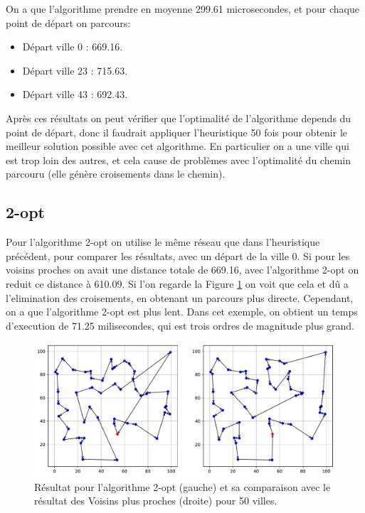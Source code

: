 \documentclass[a4paper,11pt,fleqn]{article}
\begin{document}
On a que l'algorithme prendre en moyenne 299.61 microsecondes, et pour chaque point de départ on parcours:
\begin{itemize}
    \item Départ ville 0 : 669.16.
    \item Départ ville 23 : 715.63.
    \item Départ ville 43 : 692.43.
\end{itemize}

Après ces résultats on peut vérifier que l'optimalité de l'algorithme depends du point de départ, donc il faudrait appliquer l'heuristique 50 fois pour obtenir le meilleur solution possible avec cet algorithme. En particulier on a une ville qui est trop loin des autres, et cela cause de problèmes avec l'optimalité du chemin parcouru (elle génère croisements dans le chemin).

\subsection*{2-opt}
Pour l'algorithme 2-opt on utilise le même réseau que dans l'heuristique précédent, pour comparer les résultats, avec un départ de la ville 0. Si pour les voisins proches on avait une distance totale de 669.16, avec l'algorithme 2-opt on reduit ce distance à 610.09. Si l'on regarde la Figure \ref{fig:2opt-nn} on voit que cela et dû a l'elimination des croisements, en obtenant un parcours plus directe. Cependant, on a que l'algorithme 2-opt est plus lent. Dans cet exemple, on obtient un temps d'execution de 71.25 milisecondes, qui est trois ordres de magnitude plus grand.

\begin{figure}[H]
    \centering
    \includegraphics[width=\textwidth]{images/2opt_50_villes_nn.pdf}
    \caption{Résultat pour l'algorithme 2-opt (gauche) et sa comparaison avec le résultat des Voisins plus proches (droite) pour 50 villes.}
    \label{fig:2opt-nn}
\end{figure}
\end{document}
